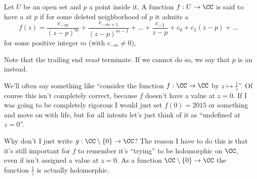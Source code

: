 \begin{definition}
	Let $U$ be an open set and $p$ a point inside it.
	A function $f : U \to \CC$ is said to have a  at $p$
	if for some deleted neighborhood of $p$ it admits a 
	\[
		f(z) =
		\frac{c_{-m}}{(z-p)^m}
		+ \frac{c_{-m+1}}{(z-p)^{m-1}}
		+ \dots
		+ \frac{c_{-1}}{z-p} + c_0 + c_1 (z-p) + \dots
	\]
	for some positive integer $m$ (with $c_{-m} \neq 0$),
\end{definition}

Note that the trailing end \emph{must} terminate.
If we cannot do so, we say that $p$ is an  instead.
\begin{abuse}
	We'll often say something like ``consider the function $f : \CC \to \CC$ by $z \mapsto \frac 1z$''.
	Of course this isn't completely correct, because $f$ doesn't have a value at $z=0$.
	If I was going to be completely rigorous I would just set $f(0) = 2015$ or something and move on
	with life, but for all intents let's just think of it as ``undefined at $z=0$''.

	Why don't I just write $g : \CC \setminus \{0\} \to \CC$?
	The reason I have to do this is that it's still important 
	for $f$ to remember it's ``trying'' to be holomorphic on $\CC$,
	even if isn't assigned a value at $z=0$.
	As a function $\CC \setminus \{0\} \to \CC$ the function $\frac 1z$ is actually holomorphic.
\end{abuse}

